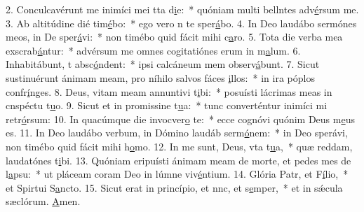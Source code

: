 2. Conculcavérunt me inimíci mei tta d\uline{i}e:~* quóniam multi bellntes adv\uline{é}rsum me.
3. Ab altitúdine dié tim\uline{é}bo:~* ego vero n te sper\uline{á}bo.
4. In Deo laudábo sermónes meos, in De sper\uline{á}vi:~* non timébo quid fácit mihi c\uline{a}ro.
5. Tota die verba mea exscrab\uline{á}ntur:~* advérsum me omnes cogitatiónes erum in m\uline{a}lum.
6. Inhabitábunt, t absc\uline{ó}ndent:~* ipsi calcáneum mem observ\uline{á}bunt.
7. Sicut sustinuérunt ánimam meam, pro níhilo salvos fáces \uline{i}llos:~* in ira póplos confr\uline{í}nges.
8. Deus, vitam meam annuntivi t\uline{i}bi:~* posuísti lácrimas meas in cnspéctu t\uline{u}o.
9. Sicut et in promissine t\uline{u}a:~* tunc converténtur inimíci mi retr\uline{ó}rsum:
10. In quacúmque die invocver\uline{o} te:~* ecce cognóvi quónim Deus m\uline{e}us es.
11. In Deo laudábo verbum, in Dómino laudáb serm\uline{ó}nem:~* in Deo sperávi, non timébo quid fácit mihi h\uline{o}mo.
12. In me sunt, Deus, vta t\uline{u}a,~* quæ reddam, laudatónes t\uline{i}bi.
13. Quóniam eripuísti ánimam meam de morte, et pedes mes de l\uline{a}psu:~* ut pláceam coram Deo in lúmne viv\uline{é}ntium.
14. Glória Patr, et F\uline{í}lio,~* et Spirtui S\uline{a}ncto.
15. Sicut erat in princípio, et nnc, et s\uline{e}mper,~* et in sǽcula sæclórum. \uline{A}men.
